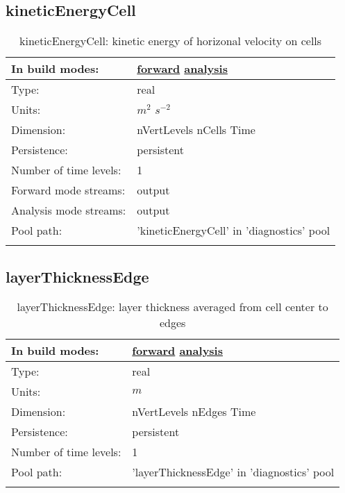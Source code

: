 \subsection[kineticEnergyCell]{kineticEnergyCell}
\label{subsec:var_sec_diagnostics_kineticEnergyCell}
\begin{center}
\begin{longtable}{| p{2.0in} | p{4.0in} |}
        \hline 
        In build modes: & \hyperref[subsec:forward_var_tab_diagnostics]{forward} \hyperref[subsec:analysis_var_tab_diagnostics]{analysis} \\
        \hline 
        Type: & real \\
        \hline 
        Units: & $m^2$ $s^{-2}$ \\
        \hline 
        Dimension: & nVertLevels nCells Time \\
        \hline 
        Persistence: & persistent \\
        \hline 
        Number of time levels: & 1 \\
        \hline 
		 Forward mode streams: &  output \\
        \hline 
		 Analysis mode streams: &  output \\
        \hline 
            Pool path: & 'kineticEnergyCell' in 'diagnostics' pool
 \\
		 \hline 
    \caption{kineticEnergyCell: kinetic energy of horizonal velocity on cells}
\end{longtable}
\end{center}
\subsection[layerThicknessEdge]{layerThicknessEdge}
\label{subsec:var_sec_diagnostics_layerThicknessEdge}
\begin{center}
\begin{longtable}{| p{2.0in} | p{4.0in} |}
        \hline 
        In build modes: & \hyperref[subsec:forward_var_tab_diagnostics]{forward} \hyperref[subsec:analysis_var_tab_diagnostics]{analysis} \\
        \hline 
        Type: & real \\
        \hline 
        Units: & $m$ \\
        \hline 
        Dimension: & nVertLevels nEdges Time \\
        \hline 
        Persistence: & persistent \\
        \hline 
        Number of time levels: & 1 \\
        \hline 
            Pool path: & 'layerThicknessEdge' in 'diagnostics' pool
 \\
		 \hline 
    \caption{layerThicknessEdge: layer thickness averaged from cell center to edges}
\end{longtable}
\end{center}
